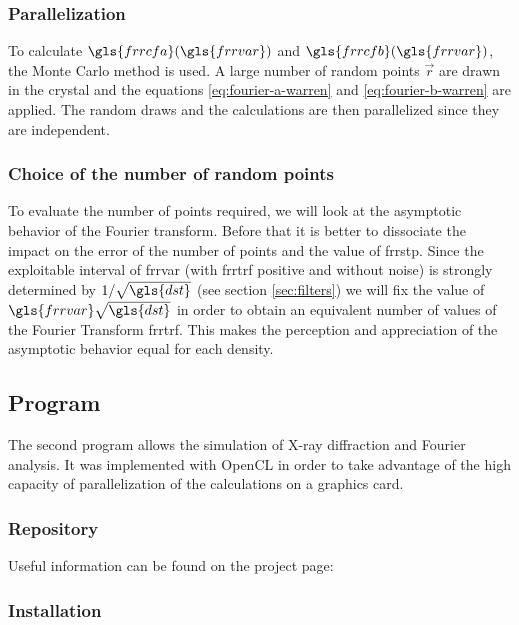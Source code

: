 {\subsubsection{Parallelization}

To calculate \( \gls{frrcfa}(\gls{frrvar}) \) and \( \gls{frrcfb}(\gls{frrvar}) \), the Monte Carlo method is used.
A large number of random points \( \vec{r} \) are drawn in the crystal and the equations \eqref{eq:fourier-a-warren} and \eqref{eq:fourier-b-warren} are applied. The random draws and the calculations are then parallelized since they are independent.

\subsubsection{Choice of the number of random points}

To evaluate the number of points required, we will look at the asymptotic behavior of the Fourier transform.
Before that it is better to dissociate the impact on the error of the number of points and the value of \gls{frrstp}.
Since the exploitable interval of \gls{frrvar} (with \gls{frrtrf} positive and without noise) is strongly determined by \( 1 / \sqrt{\gls{dst}} \) (see section \ref{sec:filters}) we will fix the value of \( \gls{frrvar} \sqrt{\gls{dst}} \) in order to obtain an equivalent number of values of the Fourier Transform \gls{frrtrf}.
This makes the perception and appreciation of the asymptotic behavior equal for each density.

\subsection{Program}

The second program allows the simulation of X-ray diffraction and Fourier analysis.
It was implemented with OpenCL in order to take advantage of the high capacity of parallelization of the calculations on a graphics card.

\subsubsection{Repository}

Useful information can be found on the project page: 

\subsubsection{Installation}

}
